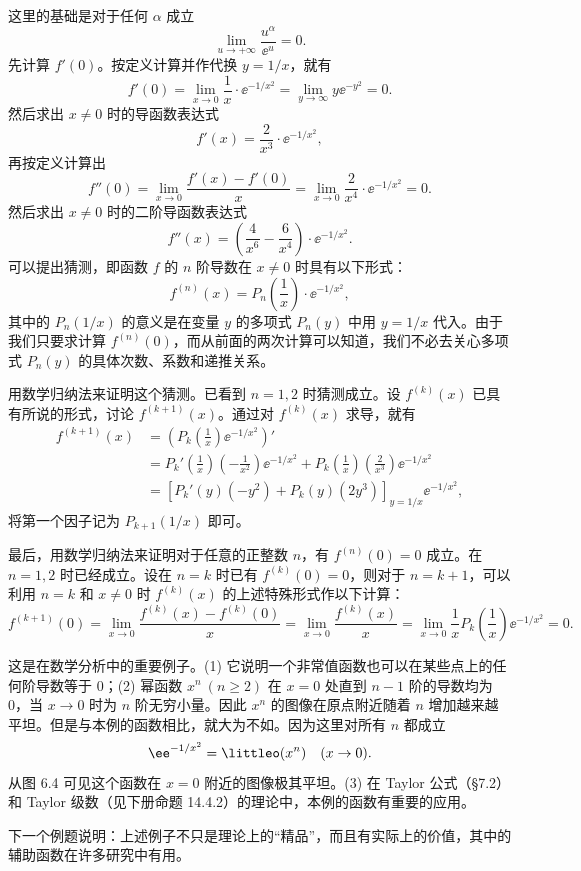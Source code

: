 \begin{xproof}
这里的基础是对于任何 $\alpha$ 成立
\[
  \lim_{u\to+\infty}\frac{u^\alpha}{\ee^u}=0.
\]
先计算 $f'(0)$。按定义计算并作代换 $y=1/x$，就有
\[
  f'(0)=\lim_{x\to0}\frac1x\cdot\ee^{-1/x^2}=\lim_{y\to\infty}y\ee^{-y^2}=0.
\]
然后求出 $x\ne0$ 时的导函数表达式
\[
  f'(x)=\frac{2}{x^3}\cdot\ee^{-1/x^2},
\]
再按定义计算出
\[
  f''(0)=\lim_{x\to0}\frac{f'(x)-f'(0)}x
  =\lim_{x\to0}\frac{2}{x^4}\cdot\ee^{-1/x^2}=0.
\]
然后求出 $x\ne0$ 时的二阶导函数表达式
\[
  f''(x)=\left(\frac4{x^6}-\frac6{x^4}\right)\cdot\ee^{-1/x^2}.
\]
可以提出猜测，即函数 $f$ 的 $n$ 阶导数在 $x\ne0$ 时具有以下形式：
\[
  f^{(n)}(x)=P_n\!\left(\frac1x\right)\cdot\ee^{-1/x^2},
\]
其中的 $P_n(1/x)$ 的意义是在变量 $y$ 的多项式 $P_n(y)$ 中用 $y=1/x$ 代入。由于我们只要求计算 $f^{(n)}(0)$，而从前面的两次计算可以知道，我们不必去关心多项式 $P_n(y)$ 的具体次数、系数和递推关系。

用数学归纳法来证明这个猜测。已看到 $n=1,2$ 时猜测成立。设 $f^{(k)}(x)$ 已具有所说的形式，讨论 $f^{(k+1)}(x)$。通过对 $f^{(k)}(x)$ 求导，就有
\begin{align*}
  f^{(k+1)}(x)
  &=\left(P_k\!\left(\frac1x\right)\ee^{-1/x^2}\right)'\\
  &=P_k'\!\left(\frac1x\right)\left(-\frac1{x^2}\right)\ee^{-1/x^2}
    +P_k\!\left(\frac1x\right)\left(\frac2{x^3}\right)\ee^{-1/x^2}\\
  &=\left[P_k'(y)(-y^2)+P_k(y)(2y^3)\right]_{y=1/x}\ee^{-1/x^2},
\end{align*}
将第一个因子记为 $P_{k+1}(1/x)$ 即可。

最后，用数学归纳法来证明对于任意的正整数 $n$，有 $f^{(n)}(0)=0$ 成立。在 $n=1,2$ 时已经成立。设在 $n=k$ 时已有 $f^{(k)}(0)=0$，则对于 $n=k+1$，可以利用 $n=k$ 和 $x\ne0$ 时 $f^{(k)}(x)$ 的上述特殊形式作以下计算：
\[
  f^{(k+1)}(0)
  =\lim_{x\to0}\frac{f^{(k)}(x)-f^{(k)}(0)}x
  =\lim_{x\to0}\frac{f^{(k)}(x)}x
  =\lim_{x\to0}\frac1xP_k\!\left(\frac1x\right)\ee^{-1/x^2}=0.
\]
\end{xproof}

\begin{xremark}
这是在数学分析中的重要例子。(1) 它说明一个非常值函数也可以在某些点上的任何阶导数等于 0；(2) 幂函数 $x^n\ (n\ge2)$ 在 $x=0$ 处直到 $n-1$ 阶的导数均为 0，当 $x\to0$ 时为 $n$ 阶无穷小量。因此 $x^n$ 的图像在原点附近随着 $n$ 增加越来越平坦。但是与本例的函数相比，就大为不如。因为这里对所有 $n$ 都成立
\[
  \ee^{-1/x^2}=\littleo(x^n)\quad(x\to0).
\]
从图 6.4 可见这个函数在 $x=0$ 附近的图像极其平坦。(3) 在 Taylor 公式（§7.2）和 Taylor 级数（见下册命题 14.4.2）的理论中，本例的函数有重要的应用。

下一个例题说明：上述例子不只是理论上的“精品”，而且有实际上的价值，其中的辅助函数在许多研究中有用。
\end{xremark}

